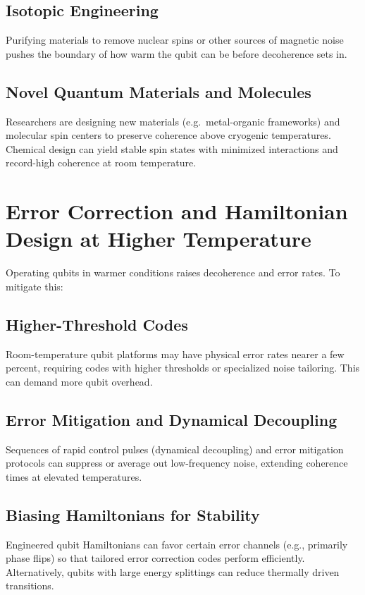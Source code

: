 \documentclass[11pt]{article}
\begin{document}
\subsection{Isotopic Engineering}
Purifying materials to remove nuclear spins or other sources of magnetic noise pushes the boundary of how warm the qubit can be before decoherence sets in.

\subsection{Novel Quantum Materials and Molecules}
Researchers are designing new materials (e.g.\ metal-organic frameworks) and molecular spin centers to preserve coherence above cryogenic temperatures. Chemical design can yield stable spin states with minimized interactions and record-high coherence at room temperature.

\section{Error Correction and Hamiltonian Design at Higher Temperature}

Operating qubits in warmer conditions raises decoherence and error rates. To mitigate this:

\subsection{Higher-Threshold Codes}
Room-temperature qubit platforms may have physical error rates nearer a few percent, requiring codes with higher thresholds or specialized noise tailoring. This can demand more qubit overhead.

\subsection{Error Mitigation and Dynamical Decoupling}
Sequences of rapid control pulses (dynamical decoupling) and error mitigation protocols can suppress or average out low-frequency noise, extending coherence times at elevated temperatures.

\subsection{Biasing Hamiltonians for Stability}
Engineered qubit Hamiltonians can favor certain error channels (e.g., primarily phase flips) so that tailored error correction codes perform efficiently. Alternatively, qubits with large energy splittings can reduce thermally driven transitions.
\end{document}

